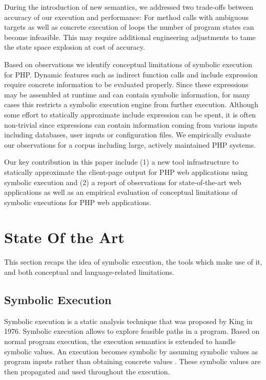 \documentclass[sigconf]{acmart}
\begin{document}
During the introduction of new semantics, we addressed two  trade-offs between
accuracy of our execution and performance: For method calls with ambiguous
targets as well as concrete execution of loops the number of program states can
become infeasible. This may require additional engineering adjustments to tame
the state space explosion at cost of accuracy.

Based on observations we identify conceptual limitations of symbolic
execution for PHP.  Dynamic features such as indirect function calls and
include expression require concrete information to be evaluated properly. Since
these expressions may be assembled at runtime and can contain symbolic
information, for many cases this restricts a symbolic execution engine from
further execution.
Although some effort to statically approximate include expression can be spent,
it is often non-trivial since expressions can contain information coming from
various inputs including databases, user inputs or configuration files. We
empirically evaluate our observations for a corpus including large, actively maintained PHP systems.

Our key contribution in this paper include (1)  a new tool infrastructure to
statically approximate the client-page output for PHP web applications using
symbolic execution and (2) a report of observations for state-of-the-art
web applications as well as an empirical evaluation of conceptual limitations
of symbolic executions for PHP web applications.

\section{State Of the Art}\label{sec:stateoftheart}
This section recaps the idea of symbolic
execution, the tools which make use of it, and both conceptual and
language-related limitations.

\subsection{Symbolic Execution}
Symbolic execution is a static analysis technique that was proposed by King
\cite{King1976} in 1976. Symbolic execution allows to explore feasible paths in a program. Based on normal program execution, the execution semantics
is extended to handle symbolic values. An execution becomes symbolic by
assuming symbolic values as program inputs rather than obtaining concrete
values \cite{King1976,Darringer1978}. These symbolic values are then propagated
and used throughout the execution. 
\end{document}
